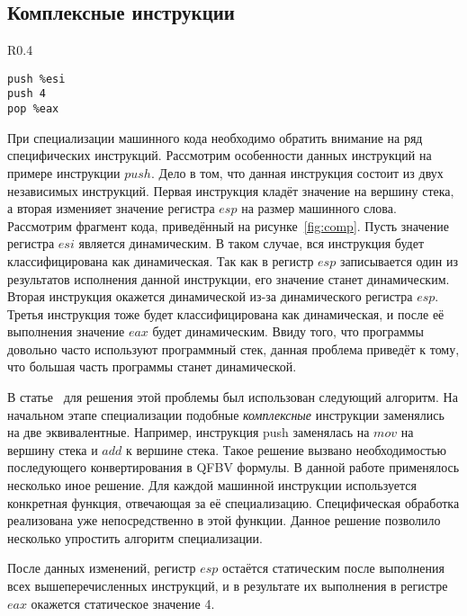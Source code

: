 \subsection{Комплексные инструкции}
\label{part:4.2}
\begin{wrapfigure}{R}{0.4\textwidth}
\begin{lstlisting}[xleftmargin = 20pt]
push %esi
push 4
pop %eax
\end{lstlisting}
\caption{Фрагмент кода: комплексные инструкции}
\label{fig:comp}
\end{wrapfigure}
При специализации машинного кода необходимо обратить внимание на ряд специфических инструкций. Рассмотрим особенности данных инструкций на примере инструкции $push$. Дело в том, что данная инструкция состоит из двух независимых инструкций. Первая инструкция кладёт значение на вершину стека, а вторая изменияет значение регистра $esp$ на размер машинного слова.
Рассмотрим фрагмент кода, приведённый на рисунке~\ref{fig:comp}.
Пусть значение регистра $esi$ является динамическим.
В таком случае, вся инструкция будет классифицирована как динамическая. Так как в регистр $esp$ записывается один из результатов исполнения данной инструкции, его значение станет динамическим. Вторая инструкция окажется динамической из-за динамического регистра $esp$.
Третья инструкция тоже будет классифицирована как  динамическая, и после её выполнения значение $eax$ будет динамическим.
Ввиду того, что программы довольно часто используют программный стек, данная проблема приведёт к тому, что большая часть программы станет динамической.

В статье~\cite{PEMC} для решения этой проблемы был использован следующий алгоритм. На начальном этапе специализации подобные
\emph{комплексные} инструкции заменялись на две эквивалентные.
Например, инструкция push заменялась на $mov$ на вершину стека и $add$ к вершине стека. Такое решение вызвано необходимостью последующего конвертирования в QFBV формулы. В данной работе применялось несколько иное решение. Для каждой машинной инструкции используется конкретная функция, отвечающая за её специализацию. Специфическая обработка реализована уже непосредственно в этой функции. Данное решение позволило несколько упростить алгоритм специализации.

После данных изменений, регистр $esp$ остаётся статическим после выполнения всех вышеперечисленных инструкций, и в результате их выполнения в регистре $eax$ окажется статическое значение 4.


